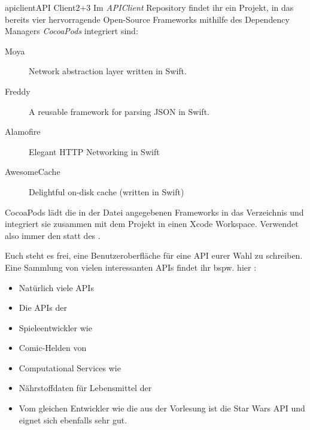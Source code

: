 \documentclass[parskip=half, final]{scrreprt}
\begin{document}
\begin{lecture}
\begin{exc}
\begin{excitem}{apiclient}{API Client}{2+3}
Im \emph{APIClient} Repository  findet ihr ein Projekt, in das bereits vier hervorragende Open-Source Frameworks mithilfe des Dependency Managers \emph{CocoaPods}  integriert sind:

\begin{description}
\item[Moya] Network abstraction layer written in Swift.
\item[Freddy] A reusable framework for parsing JSON in Swift.
\item[Alamofire] Elegant HTTP Networking in Swift
\item[AwesomeCache] Delightful on-disk cache (written in Swift)
\end{description}

CocoaPods lädt die in der  Datei angegebenen Frameworks in das  Verzeichnis und integriert sie zusammen mit dem Projekt in einen Xcode Workspace. Verwendet also immer den  statt des .

Euch steht es frei, eine Benutzeroberfläche für eine API eurer Wahl zu schreiben. Eine Sammlung von vielen interessanten APIs findet ihr bspw. hier :
\begin{itemize}
\item Natürlich viele  APIs 
\item Die APIs der  
\item Spieleentwickler wie  
\item Comic-Helden von  
\item Computational Services wie  
\item Nährstoffdaten für Lebensmittel der  
\item Vom gleichen Entwickler wie die   aus der Vorlesung  ist die Star Wars API   und eignet sich ebenfalls sehr gut.
\end{itemize}


\end{excitem}
\end{exc}
\end{lecture}
\end{document}
